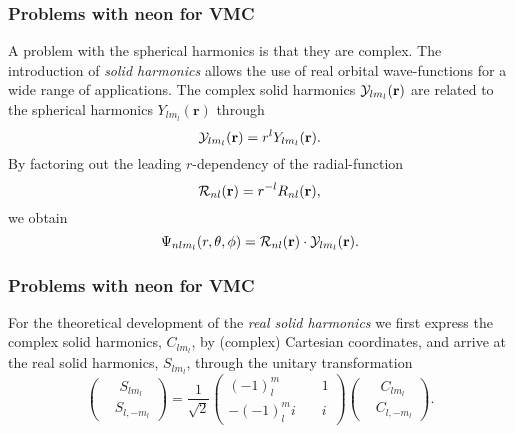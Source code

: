 \documentclass[compress]{beamer}
\begin{document}
\frame
{
  \frametitle{Problems with neon for VMC}
\begin{small}
{\scriptsize
A problem with the spherical harmonics is that they are complex. The introduction of
\emph{solid harmonics} allows the use
of real orbital wave-functions for a wide range of applications. The
complex solid harmonics ${\cal Y}_{lm_l}(\mathbf{r})$ are related to
the spherical harmonics  $Y_{lm_l}(\mathbf{r})$ through
\begin{equation*}
  {\cal Y}_{lm_l}(\mathbf{r}) = r^l Y_{lm_l}(\mathbf{r}).
\end{equation*}
By factoring out the leading $r$-dependency of the radial-function
\begin{equation*}
  {\cal R}_{nl}(\mathbf{r}) = r^{-l} R_{nl}(\mathbf{r}),
\end{equation*}
we obtain 
\begin{equation*}
  \Psi_{nlm_l}(r,\theta, \phi) %
  = {\cal R}_{nl}(\mathbf{r})\cdot{\cal Y}_{lm_l}(\mathbf{r}).
\end{equation*}
}
\end{small}
}










\frame
{
  \frametitle{Problems with neon for VMC}
\begin{small}
{\scriptsize
For the theoretical development of the \emph{real solid harmonics} we first 
express the complex solid harmonics, $C_{lm_l}$, by (complex) Cartesian
coordinates, and arrive at the real solid harmonics, $S_{lm_l}$, through
the unitary transformation
\begin{equation*}
  \left( \begin{split} &\phantom{i} S_{lm_l} \\ 
    &S_{l,-m_l} \end{split} \right) 
  = \frac{1}{\sqrt{2}} \left(        \begin{split}
    (-1)^m_l \phantom{a} & \phantom{aa} 1 \\ 
    -(-1)^m_l i & \phantom{aa} i       \end{split} \right)  
  \left( \begin{split} &\phantom{i} C_{lm_l} \\ 
    &C_{l,-m_l} \end{split} \right).
\end{equation*}
}
\end{small}
}
\end{document}
